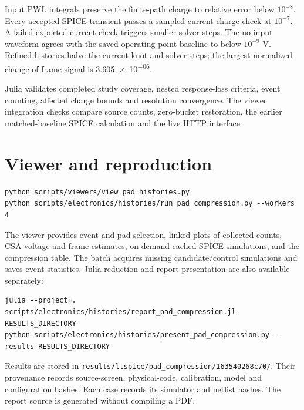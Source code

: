 \documentclass[11pt,a4paper]{article}
\begin{document}
Input PWL integrals preserve the finite-path charge to relative error below
$10^{-8}$. Every accepted SPICE transient passes a sampled-current charge check
at $10^{-7}$. A failed exported-current check triggers smaller solver steps.
The no-input waveform agrees with the saved operating-point baseline to below
$10^{-9}$ V. Refined histories halve the current-knot and solver steps; the
largest normalized change of frame signal is \num{3.605e-06}.

Julia validates completed study coverage, nested response-loss criteria, event
counting, affected charge bounds and resolution convergence. The viewer
integration checks compare source counts, zero-bucket restoration, the earlier
matched-baseline SPICE calculation and the live HTTP interface.

\section{Viewer and reproduction}
\begin{verbatim}
python scripts/viewers/view_pad_histories.py
python scripts/electronics/histories/run_pad_compression.py --workers 4
\end{verbatim}
The viewer provides event and pad selection, linked plots of collected counts,
CSA voltage and frame estimates, on-demand cached SPICE simulations, and the
compression table. The batch acquires missing candidate/control simulations and
saves event statistics. Julia reduction and report presentation are also
available separately:
\begin{verbatim}
julia --project=. scripts/electronics/histories/report_pad_compression.jl RESULTS_DIRECTORY
python scripts/electronics/histories/present_pad_compression.py --results RESULTS_DIRECTORY
\end{verbatim}
Results are stored in \texttt{results/ltspice/pad\_compression/163540268c70/}.
Their provenance records source-screen, physical-code, calibration, model and
configuration hashes. Each case records its simulator and netlist hashes.
The report source is generated without compiling a PDF.
\end{document}
